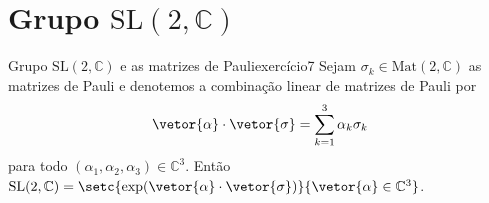\section[Grupo SL(2, C)]{Grupo \(\mathrm{SL}(2, \mathbb{C})\)}
\begin{proposition}{Grupo \(\mathrm{SL}(2, \mathbb{C})\) e as matrizes de Pauli}{exercício7}
    Sejam \(\sigma_k \in \mathrm{Mat}(2, \mathbb{C})\) as matrizes de Pauli e denotemos a combinação linear de matrizes de Pauli por
    \begin{equation*}
        \vetor{\alpha} \cdot \vetor{\sigma} = \sum_{k = 1}^3 \alpha_k \sigma_k
    \end{equation*}
    para todo \((\alpha_1, \alpha_2, \alpha_3) \in \mathbb{C}^3\). Então \(\mathrm{SL}(2,\mathbb{C}) = \setc{\exp(\vetor{\alpha}\cdot \vetor{\sigma})}{\vetor{\alpha} \in \mathbb{C}^3}\).
\end{proposition}
